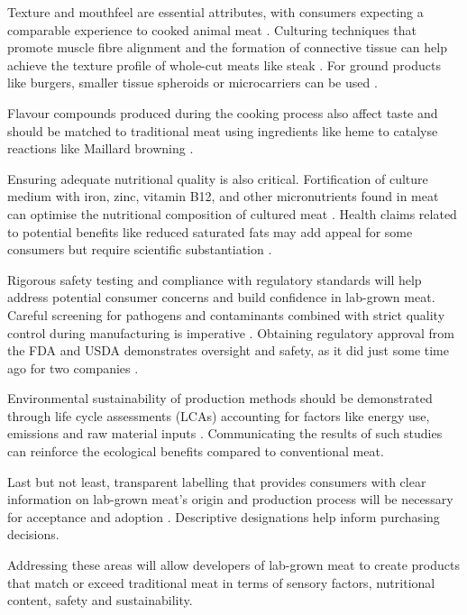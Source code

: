 \documentclass[10pt]{article}
\begin{document}
\begin{sloppypar}
  Texture and mouthfeel are essential attributes, with consumers expecting a comparable experience to cooked animal meat \citep{datar_possibilities_2010}. Culturing techniques that promote muscle fibre alignment and the formation of connective tissue can help achieve the texture profile of whole-cut meats like steak \citep{post_cultured_2012}. For ground products like burgers, smaller tissue spheroids or microcarriers can be used \citep{specht_opportunities_2018}.

  Flavour compounds produced during the cooking process also affect taste and should be matched to traditional meat using ingredients like heme to catalyse reactions like Maillard browning \citep{post_cultured_2012}.

  Ensuring adequate nutritional quality is also critical. Fortification of culture medium with iron, zinc, vitamin B12, and other micronutrients found in meat can optimise the nutritional composition of cultured meat \citep{fraeye_sensorial_2020}. Health claims related to potential benefits like reduced saturated fats may add appeal for some consumers but require scientific substantiation \citep{sergelidis_lab_2019}.

  Rigorous safety testing and compliance with regulatory standards will help address potential consumer concerns and build confidence in lab-grown meat. Careful screening for pathogens and contaminants combined with strict quality control during manufacturing is imperative \citep{ong_food_2021}. Obtaining regulatory approval from the FDA and USDA demonstrates oversight and safety, as it did just some time ago for two companies \citep{mccarthy_usda_nodate}.

  Environmental sustainability of production methods should be demonstrated through life cycle assessments (LCAs) accounting for factors like energy use, emissions and raw material inputs \citep{mattick_anticipatory_2015}. Communicating the results of such studies can reinforce the ecological benefits compared to conventional meat.

  Last but not least, transparent labelling that provides consumers with clear information on lab-grown meat’s origin and production process will be necessary for acceptance and adoption \citep{failla_evaluation_2023}. Descriptive designations help inform purchasing decisions.

  Addressing these areas will allow developers of lab-grown meat to create products that match or exceed traditional meat in terms of sensory factors, nutritional content, safety and sustainability.


\end{sloppypar}
\end{document}
